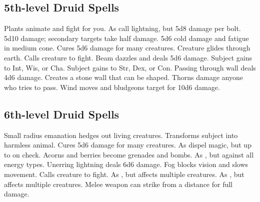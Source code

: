 \subsection{5th-level Druid Spells}
\begin{spelllist}
   Plants animate and fight for you.
   As call lightning, but 5d8 damage per bolt.
   5d10 damage; secondary targets take half damage.
   5d6 cold damage and fatigue in medium cone.
   Cures 5d6 damage for many creatures.
   Creature glides through earth. 
   Calls creature to fight.
   Beam dazzles and deals 5d6 damage.
   Subject gains  to Int, Wis, or Cha.
   Subject gains  to Str, Dex, or Con.
   Passing through wall deals 4d6 damage.
   Creates a stone wall that can be shaped.
   Thorns damage anyone who tries to pass.
   Wind moves and bludgeons target for 10d6 damage.
\end{spelllist}

\subsection{6th-level Druid Spells}
\begin{spelllist}
   Small radius emanation hedges out living creatures.
   Transforms subject into harmless animal.
   Cures 5d6 damage for many creatures.
   As dispel magic, but up to  on check.
   Acorns and berries become grenades and bombs.
   As , but against all energy types.
   Unerring lightning deals 6d6 damage.
   Fog blocks vision and slows movement.
   Calls creature to fight.
   As , but affects multiple creatures.
   As , but affects multiple creatures.
   Melee weapon can strike from a distance for full damage.
\end{spelllist}

